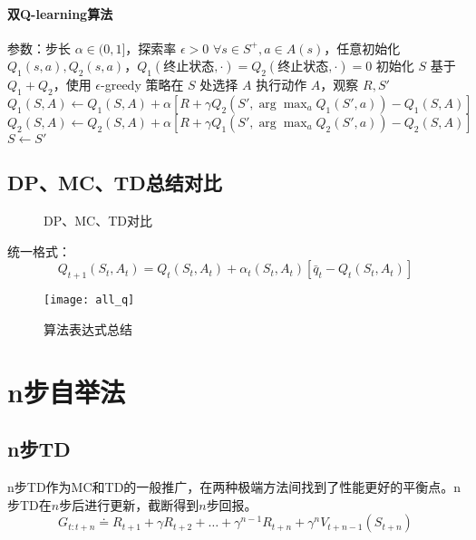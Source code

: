 \documentclass[
12pt, %
a4paper, 
oneside, %
headinclude,footinclude, %
]{scrartcl}
\begin{document}
\paragraph{双Q-learning算法}
\begin{myalgorithm}[双Q-learning算法]
\State 参数：步长 $\alpha \in (0,1]$，探索率 $\epsilon > 0$
\State $\forall s \in S^+, a \in A(s)$，任意初始化 $Q_1(s,a),Q_2(s,a)$，$Q_1(\text{终止状态},\cdot) = Q_2(\text{终止状态},\cdot) = 0$
    \State 初始化 $S$
        \State 基于 $Q_1 + Q_2$，使用 $\epsilon$-greedy 策略在 $S$ 处选择 $A$
        \State 执行动作 $A$，观察 $R,S'$
            \State $Q_1(S, A) \gets Q_1(S, A) + \alpha [R + \gamma Q_2(S', \arg\max_a Q_1(S',a)) - Q_1(S, A)]$
        \Else
            \State $Q_2(S, A) \gets Q_2(S, A) + \alpha [R + \gamma Q_1(S', \arg\max_a Q_2(S',a)) - Q_2(S, A)]$
        \EndIf
        \State $S \gets S'$
    \EndWhile
\EndFor
\end{myalgorithm}
\subsection{DP、MC、TD总结对比}
\begin{figure}[H]
\centering
{} \quad
{} \quad
{}
\caption[DP、MC、TD对比]{DP、MC、TD对比}
\end{figure}
统一格式：
$$ Q_{t + 1}(S_t, A_t) = Q_t(S_t, A_t) + \alpha_t(S_t, A_t)[\bar{q}_t - Q_t(S_t, A_t)] $$

\begin{figure}[H]
\centering
\texttt{[image: all\_q]}
\caption[算法表达式总结]{算法表达式总结}
\end{figure}
\section{n步自举法}
\subsection{n步TD}
n步TD作为MC和TD的一般推广，在两种极端方法间找到了性能更好的平衡点。n步TD在$ n $步后进行更新，截断得到$ n $步回报。
$$ G_{t:t + n} \doteq R_{t + 1} + \gamma R_{t + 2} + \dots + \gamma^{n - 1} R_{t + n} + \gamma^n V_{t + n - 1}(S_{t + n}) $$
\end{document}
